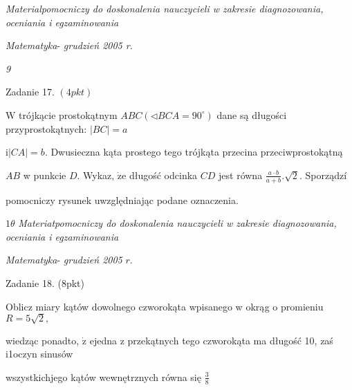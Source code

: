 \documentclass[a4paper,12pt]{article}
\begin{document}
{\it Materialpomocniczy do doskonalenia nauczycieli w zakresie diagnozowania, oceniania i egzaminowania}

{\it Matematyka}- {\it grudzień 2005 r}.

{\it 9}

Zadanie 17. $(4pkt)$

$\mathrm{W}$ trójkącie prostokątnym $ABC(\triangleleft BCA=90^{\circ})$ dane są długości przyprostokątnych: $|BC|=a$

$\mathrm{i} |CA|=b$. Dwusieczna kąta prostego tego trójkąta przecina przeciwprostokątną

$AB$ w punkcie $D$. Wykaz, $\dot{\mathrm{z}}\mathrm{e}$ długość odcinka $CD$ jest równa $\displaystyle \frac{a\cdot b}{a+b}.\sqrt{2}$. Sporządzí

pomocniczy rysunek uwzględniając podane oznaczenia.





$ 1\theta$ {\it Materiatpomocniczy do doskonalenia nauczycieli w zakresie diagnozowania, oceniania i egzaminowania}

{\it Matematyka}- {\it grudzień 2005} $r.$

Zadanie 18. (8pkt)

Oblicz miary kątów dowolnego czworokąta wpisanego w okrąg o promieniu $R=5\sqrt{2},$

wiedząc ponadto, $\dot{\mathrm{z}}$ ejedna z przekątnych tego czworokąta ma długość 10, zaś i1oczyn sinusów

wszystkichjego kątów wewnętrznych równa się $\displaystyle \frac{3}{8}$
\end{document}

